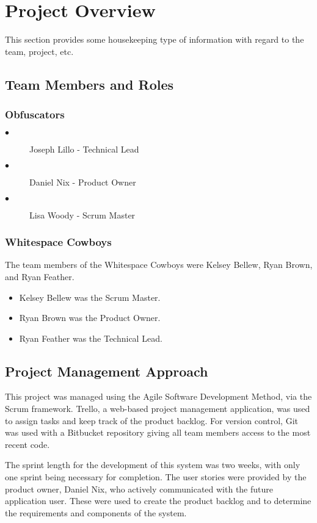 

\chapter{Project Overview}
This section provides some housekeeping type of information with regard to the 
team, project, etc. 



\section{Team Members and Roles}
\subsection{Obfuscators}
\begin{description}
\item[$\bullet$ ] Joseph Lillo - Technical Lead
\item[$\bullet$ ] Daniel Nix - Product Owner
\item[$\bullet$ ] Lisa Woody - Scrum Master
\end{description}
\subsection{Whitespace Cowboys}
The team members of the Whitespace Cowboys were Kelsey Bellew, Ryan Brown, and Ryan Feather. 

\begin{itemize}
\item Kelsey Bellew was the Scrum Master.
\item Ryan Brown was the Product Owner.
\item Ryan Feather was the Technical Lead.
\end{itemize}




\section{Project  Management Approach}
This project was managed using the Agile Software Development Method, via the Scrum framework.
Trello, a web-based project management application, was used to assign tasks and keep track of 
the product backlog.  For version control, Git was used with a Bitbucket repository giving all 
team members access to the most recent code.

The sprint length for the development of this system was two weeks, with
only one sprint being necessary for completion.  The user stories were provided by the product 
owner, Daniel Nix, who actively communicated with the future application user.  These were used
to create the product backlog and to determine the requirements and components of the system.


